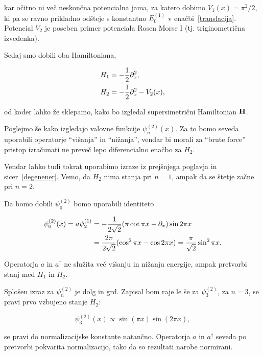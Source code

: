 kar o\v citno ni ve\v c neskon\v cna potencialna jama, za katero dobimo $V_1(x) = \pi^2/2$, ki pa se ravno
prikladno od\v steje s konstantno $E_0^{(1)}$ v ena\v cbi~\eqref{translacija}. Potencial $V_2$ je poseben primer
potenciala Rosen Morse I (tj. triginometri\v cna izvedenka).

Sedaj smo dobili oba Hamiltoniana,

\begin{align}
	H_1 &= -\frac{1}{2}\partial_x^2, \notag \\
	H_2 &= -\frac{1}{2}\partial_x^2 - V_2(x),
\end{align}

od koder lahko \v ze sklepamo, kako bo izgledal supersimetri\v cni Hamiltonian $\mathbf{H}$.

Poglejmo \v se kako izgledajo valovne funkcije $\psi_n^{(2)}(x)$. Za to bomo seveda uporabili
operatorje "`vi\v sanja"' in "`ni\v zanja"', vendar bi morali za "`brute force"' pristop
izra\v cunati ne preve\v c lepo diferencialno ena\v cbo za $H_2$.

Vendar lahko tudi tokrat uporabimo izraze iz prej\v snjega poglavja in sicer~\eqref{degenener}.
Vemo, da $H_2$ nima stanja pri $n = 1$, ampak da se \v stetje za\v cne pri $n = 2$.

Da bomo dobili $\psi_0^{(2)}$ bomo uporabili identiteto

\begin{align}
	\psi_0^{(2)} (x) = a\psi_2^{(1)} &= -\frac{1}{2\sqrt{2}}(\pi \cot \pi x -
		\partial_x)\sin2\pi x \\
	&= \frac{2\pi}{2\sqrt{2}}(\cos^2\pi x - \cos 2\pi x) = \frac{\pi}{\sqrt{2}}\sin^2\pi x.
\end{align}

Operatorja $a$ in $a^\dagger$ ne slu\v zita ve\v c vi\v sanju in ni\v zanju energije, ampak
pretvorbi stanj med $H_1$ in $H_2$.

Splo\v sen izraz za $\psi_n^{(2)}$ je dolg in grd. Zapisal bom raje le \v se za
$\psi_3^{(2)}$, za $n=3$, se pravi prvo vzbujeno stanje $H_2$:

\begin{equation}
	\psi_3^{(2)}(x) \propto \sin (\pi x) \sin (2\pi x),
\end{equation}

se pravi do normalizacijske konstante natan\v cno. Operatorja $a$ in $a^\dagger$ seveda
po pretvorbi pokvarita normalizacijo, tako da so rezultati narobe normirani.

